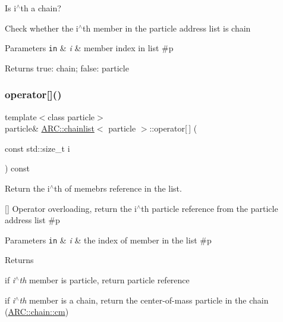 Is i$^\wedge$th a chain? 

Check whether the i$^\wedge$th member in the particle address list is chain 
\begin{DoxyParams}[1]{Parameters}
\mbox{\tt in}  & {\em i} & member index in list \#p \\
\hline
\end{DoxyParams}
\begin{DoxyReturn}{Returns}
true\+: chain; false\+: particle 
\end{DoxyReturn}
\hypertarget{classARC_1_1chainlist_a1d932a24ef6bbf98df3bc2a8b6162ddc}{}\label{classARC_1_1chainlist_a1d932a24ef6bbf98df3bc2a8b6162ddc} 
\subsubsection{\texorpdfstring{operator[]()}{operator[]()}}
{\footnotesize\ttfamily template$<$class particle$>$ \\
particle\& \hyperlink{classARC_1_1chainlist}{A\+R\+C\+::chainlist}$<$ particle $>$\+::operator\mbox{[}$\,$\mbox{]} (\begin{DoxyParamCaption}\item[{const std\+::size\+\_\+t}]{i }\end{DoxyParamCaption}) const\hspace{0.3cm}{\ttfamily [inline]}}



Return the i$^\wedge$th of memebr\textquotesingle{}s reference in the list. 

\mbox{[}\mbox{]} Operator overloading, return the i$^\wedge$th particle reference from the particle address list \#p 
\begin{DoxyParams}[1]{Parameters}
\mbox{\tt in}  & {\em i} & the index of member in the list \#p \\
\hline
\end{DoxyParams}
\begin{DoxyReturn}{Returns}

\begin{DoxyItemize}
\item if {\itshape i$^\wedge$th} member is particle, return particle reference
\item if {\itshape i$^\wedge$th} member is a chain, return the center-\/of-\/mass particle in the chain (\hyperlink{classARC_1_1chain_ae9f6a5cbf7aac2b33c7274e7e10916ed}{A\+R\+C\+::chain\+::cm}) 
\end{DoxyItemize}
\end{DoxyReturn}
\hypertarget{classARC_1_1chainlist_aea5f83e036a5e4649158f13cf341a31e}{}\label{classARC_1_1chainlist_aea5f83e036a5e4649158f13cf341a31e} 
